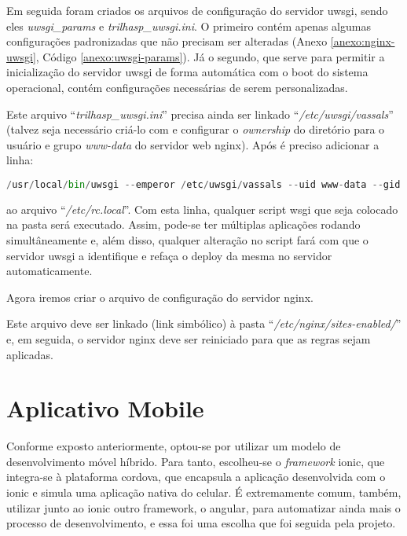 Em seguida foram criados os arquivos de configuração do servidor \gls{uwsgi}, sendo eles \textit{uwsgi\_params} e \textit{trilhasp\_uwsgi.ini}.
O primeiro contém apenas algumas configurações padronizadas que não precisam ser alteradas (Anexo \ref{anexo:nginx-uwsgi}, Código \ref{anexo:uwsgi-params}). Já o segundo, que serve para permitir a inicialização do servidor \gls{uwsgi} de forma automática com o boot do sistema operacional, contém configurações necessárias de serem personalizadas.


Este arquivo ``\textit{trilhasp\_uwsgi.ini}''  precisa ainda ser linkado ``\textit{/etc/uwsgi/vassals}'' (talvez seja necessário criá-lo com e configurar o \textit{ownership} do diretório para o usuário e grupo \textit{www-data} do servidor web \gls{nginx}). Após é preciso adicionar a linha:
\begin{lstlisting}[language={Python},caption={Inicialização automática do servidor uWSGI}]
/usr/local/bin/uwsgi --emperor /etc/uwsgi/vassals --uid www-data --gid www-data
\end{lstlisting}
ao arquivo ``\textit{/etc/rc.local}''. Com esta linha, qualquer script wsgi que seja colocado na pasta será executado. Assim, pode-se ter múltiplas aplicações rodando simultâneamente e, além disso, qualquer alteração no script fará com que o servidor \gls{uwsgi} a identifique e refaça o deploy da mesma no servidor automaticamente.

Agora iremos criar o arquivo de configuração do servidor nginx.


Este arquivo deve ser linkado (link simbólico) à pasta ``\textit{/etc/nginx/sites-enabled/}'' e, em seguida, o servidor \gls{nginx} deve ser reiniciado para que as regras sejam aplicadas.

\section{Aplicativo Mobile}\label{sec:spec-appmobile}
Conforme exposto anteriormente, optou-se por utilizar um modelo de desenvolvimento móvel híbrido. Para tanto, escolheu-se o \textit{framework} \gls{ionic}, que integra-se à plataforma \gls{cordova}, que encapsula a aplicação desenvolvida com o \gls{ionic} e simula uma aplicação nativa do celular. É extremamente comum, também, utilizar junto ao \gls{ionic} outro framework, o \gls{angular}, para automatizar ainda mais o processo de desenvolvimento, e essa foi uma escolha que foi seguida pela projeto.

